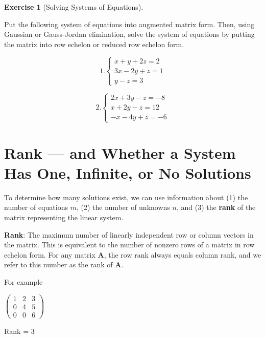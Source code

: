 \documentclass[
]{book}
\theoremstyle{definition}
\theoremstyle{definition}
\theoremstyle{definition}
\newtheorem{exercise}{Exercise}[chapter]
\theoremstyle{remark}
\begin{document}
\begin{exercise}[Solving Systems of Equations]
\protect\hypertarget{exr:solvesys1}{}{\label{exr:solvesys1} {} }

Put the following system of equations into augmented matrix form. Then, using Gaussian or Gauss-Jordan elimination, solve the system of equations by putting the matrix into row echelon or reduced row echelon form.

\[
  1. \begin{cases}
               x + y + 2z = 2\\
               3x - 2y + z = 1\\
               y - z = 3
            \end{cases}
               \]

\[
  2. \begin{cases}
               2x + 3y - z = -8\\
               x + 2y - z = 12\\
             -x -4y + z = -6
            \end{cases}
               \]
\end{exercise}

\hypertarget{rank-and-whether-a-system-has-one-infinite-or-no-solutions}{%
\section{Rank --- and Whether a System Has One, Infinite, or No Solutions}\label{rank-and-whether-a-system-has-one-infinite-or-no-solutions}}

To determine how many solutions exist, we can use information about (1) the number of equations \(m\), (2) the number of unknowns \(n\), and (3) the \textbf{rank} of the matrix representing the linear system.

\textbf{Rank}: The maximum number of linearly independent row or column vectors in the matrix. This is equivalent to the number of nonzero rows of a matrix in row echelon form. For any matrix \textbf{A}, the row rank always equals column rank, and we refer to this number as the rank of \textbf{A}.

For example

\(\begin{pmatrix} 1 & 2 & 3 \\  0 & 4 & 5 \\  0 & 0 & 6 \end{pmatrix}\)

Rank = 3
\end{document}
